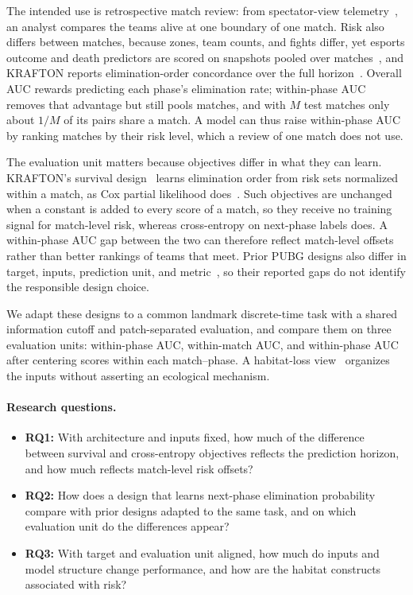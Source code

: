 \documentclass[sigconf,anonymous,nonacm]{acmart}
\begin{document}
The intended use is retrospective match review: from spectator-view telemetry~\cite{PUBGAPI,Zheng15}, an analyst compares the teams alive at one boundary of one match. Risk also differs between matches, because zones, team counts, and fights differ, yet esports outcome and death predictors are scored on snapshots pooled over matches~\cite{Hodge21,Katona19,Marshall22}, and KRAFTON reports elimination-order concordance over the full horizon~\cite{KRAFTON}. Overall AUC rewards predicting each phase's elimination rate; within-phase AUC removes that advantage but still pools matches, and with $M$ test matches only about $1/M$ of its pairs share a match. A model can thus raise within-phase AUC by ranking matches by their risk level, which a review of one match does not use.

The evaluation unit matters because objectives differ in what they can learn. KRAFTON's survival design~\cite{KRAFTON} learns elimination order from risk sets normalized within a match, as Cox partial likelihood does~\cite{Cox72}. Such objectives are unchanged when a constant is added to every score of a match, so they receive no training signal for match-level risk, whereas cross-entropy on next-phase labels does. A within-phase AUC gap between the two can therefore reflect match-level offsets rather than better rankings of teams that meet. Prior PUBG designs also differ in target, inputs, prediction unit, and metric~\cite{Sagong25a,KRAFTON}, so their reported gaps do not identify the responsible design choice.

We adapt these designs to a common landmark discrete-time task with a shared information cutoff and patch-separated evaluation, and compare them on three evaluation units: within-phase AUC, within-match AUC, and within-phase AUC after centering scores within each match--phase. A habitat-loss view~\cite{Fahrig03} organizes the inputs without asserting an ecological mechanism.

\paragraph{Research questions.}
\begin{itemize}
\item \textbf{RQ1:} With architecture and inputs fixed, how much of the difference between survival and cross-entropy objectives reflects the prediction horizon, and how much reflects match-level risk offsets?
\item \textbf{RQ2:} How does a design that learns next-phase elimination probability compare with prior designs adapted to the same task, and on which evaluation unit do the differences appear?
\item \textbf{RQ3:} With target and evaluation unit aligned, how much do inputs and model structure change performance, and how are the habitat constructs associated with risk?
\end{itemize}
\end{document}
